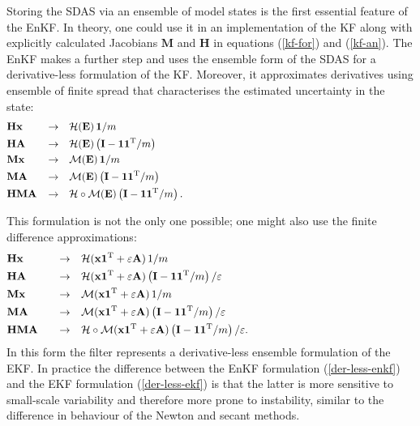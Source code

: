 \documentclass[11pt]{report}
\newcommand{\mb} {\mathbf}
\newcommand{\T}{^{\tiny \mathrm T}}
\begin{document}
Storing the SDAS via an ensemble of model states is the first essential feature of the EnKF.
In theory, one could use it in an implementation of the KF along with explicitly calculated Jacobians $\mb M$ and $\mb H$ in equations (\ref{kf-for}) and (\ref{kf-an}).
The EnKF makes a further step and uses the ensemble form of the SDAS for a derivative-less formulation of the KF.
Moreover, it approximates derivatives using ensemble of finite spread that characterises the estimated uncertainty in the state:
\begin{subequations}
  \label{der-less-enkf}
  \begin{align}
    &\mb H \mb x \quad &\to& \quad \mathcal H (\mb E) \, \mb 1 / m \hspace{10cm}\\
    &\mb H \mb A \quad &\to& \quad \mathcal H(\mb E)\left(\mb I - \mb 1 \mb 1\T / m\right)\\
    &\mb M \mb x \quad &\to& \quad \mathcal M (\mb E) \, \mb 1 / m\\
    &\mb M \mb A \quad &\to& \quad \mathcal M(\mb E)\left(\mb I - \mb 1 \mb 1\T / m\right)\\
    &\mb H \mb M \mb A &\to& \quad \mathcal H \circ \mathcal M(\mb E) \left(\mb I - \mb 1 \mb 1\T /m \right).
  \end{align}
\end{subequations}

This formulation is not the only one possible; one might also use the finite difference approximations:
\begin{subequations}
  \label{der-less-ekf}
  \begin{align}
    &\mb H \mb x \quad &\to& \quad \mathcal H (\mb x \mb 1\T + \varepsilon \mb A) \, 1/m \hspace{8cm}\\
    &\mb H \mb A \quad &\to& \quad \mathcal H(\mb x \mb 1\T + \varepsilon \mb A)\left(\mb I - \mb 1 \mb 1\T / m\right) / \varepsilon\\
    &\mb M \mb x \quad &\to& \quad \mathcal M (\mb x \mb 1\T + \varepsilon \mb A) \, 1/m\\
    &\mb M \mb A \quad &\to& \quad \mathcal M(\mb x \mb 1\T + \varepsilon \mb A)\left(\mb I - \mb 1 \mb 1\T / m\right) / \varepsilon\\
    &\mb H \mb M \mb A \quad &\to& \quad \mathcal H \circ \mathcal M(\mb x \mb 1\T + \varepsilon \mb A)\left(\mb I - \mb 1 \mb 1\T / m\right) / \varepsilon.
  \end{align}
\end{subequations}
In this form the filter represents a derivative-less ensemble formulation of the EKF.
In practice the difference between the EnKF formulation (\ref{der-less-enkf}) and the EKF formulation (\ref{der-less-ekf}) is that the latter is more sensitive to small-scale variability and therefore more prone to instability, similar to the difference in behaviour of the Newton and secant methods.
\end{document}
